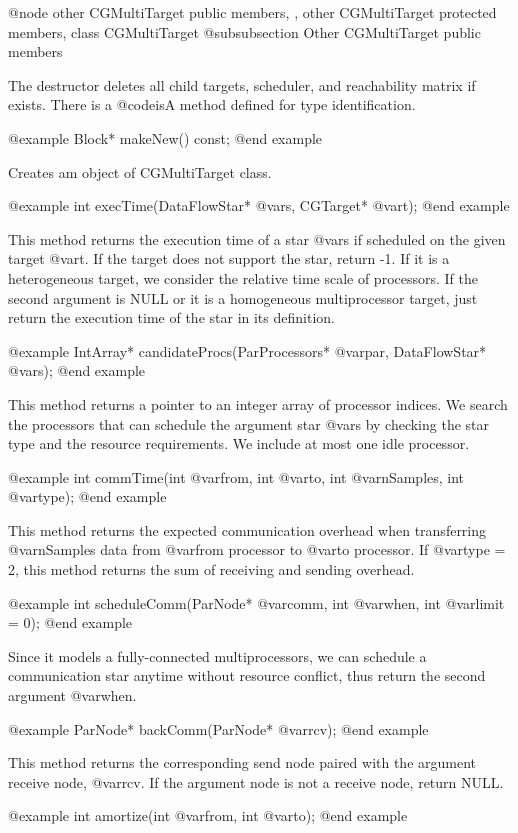@node other CGMultiTarget public members, , other CGMultiTarget protected members, class CGMultiTarget
@subsubsection Other CGMultiTarget public members

The destructor deletes all child targets, scheduler, and reachability matrix
if exists. There is a @code{isA} method defined for type identification.

@example
Block* makeNew() const;
@end example

Creates am object of CGMultiTarget class.

@example
int execTime(DataFlowStar* @var{s}, CGTarget* @var{t});
@end example

This method returns the execution time of a star @var{s} if scheduled on
the given target @var{t}. If the target does not support the star, return -1.
If it is a heterogeneous target, we consider the relative time scale of
processors. If the second argument is NULL or it is a homogeneous 
multiprocessor target, just return the execution time of the star in its
definition.

@example
IntArray* candidateProcs(ParProcessors* @var{par}, DataFlowStar* @var{s});
@end example

This method returns a pointer to an integer array of processor indices.
We search the processors that can schedule the argument star @var{s}
by checking the star type and the resource requirements. We include at most
one idle processor.

@example
int commTime(int @var{from}, int @var{to}, int @var{nSamples}, int @var{type});
@end example

This method returns the expected communication overhead when transferring
@var{nSamples} data from @var{from} processor to @var{to} processor. If
@var{type} = 2, this method returns the sum of receiving and sending
overhead.

@example
int scheduleComm(ParNode* @var{comm}, int @var{when}, int @var{limit} = 0);
@end example

Since it models a fully-connected multiprocessors, we can schedule
a communication star anytime without resource conflict, thus return the
second argument @var{when}.

@example
ParNode* backComm(ParNode* @var{rcv});
@end example

This method returns the corresponding send node paired with the argument
receive node, @var{rcv}. If the argument node is not a receive node, return
NULL.

@example
int amortize(int @var{from}, int @var{to});
@end example

